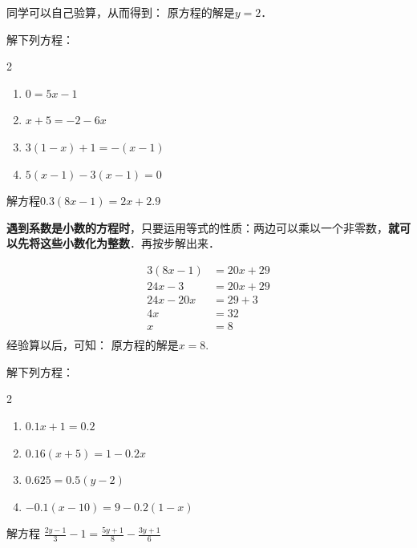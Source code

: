 同学可以自己验算，从而得到： 原方程的解是$y=2$．


\begin{ex}
解下列方程： 
\begin{multicols}{2}
    \begin{enumerate}
\item $0=5x-1$
\item   $x+5=-2-6x$
\item $3(1-x)+1=-(x-1)$      
\item $5(x-1)-3(x-1)=0$
    \end{enumerate}
\end{multicols}
\end{ex}

\begin{example}
    解方程$0.3(8x-1)=2x+2.9$
\end{example}

\begin{analyze}
    \textbf{遇到系数是小数的方程时}，只要运用等式的性质：两边可以乘以一个非零数，\textbf{就可以先将这些小数化为整数}．再按步解出来．
\end{analyze}

\begin{solution}
\begin{align*}
    3 (8x-1)&=20x+29  \tag{原方程两边乘以10}\\
    24x-3&=20x+29   \tag{去括号}\\
    24x-20x&=29+3\tag{移项变号}\\
    4x &= 32\tag{合并同类项}\\
    x&=8\tag{两边除以4}\\
\end{align*}
经验算以后，可知：
原方程的解是$x=8$.    
\end{solution}

\begin{ex}
解下列方程：
\begin{multicols}{2}
\begin{enumerate}
    \item $0.1x+1=0.2$
    \item $0.16(x+5)=1-0.2x$
    \item $0.625=0.5(y-2)$
    \item $-0.1(x-10)=9-0.2(1-x)$
\end{enumerate}
\end{multicols}
\end{ex}

\begin{example}
  解方程
$\frac{2y-1}{3}-1=\frac{5y+1}{8}-\frac{3y+1}{6}$
\end{example}

